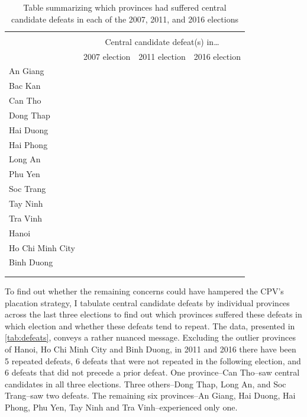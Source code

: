 \documentclass[12pt]{article}
\newcommand{\1}{\mathbbm{1}}
\begin{document}
\begin{table}[]
	\centering
	\caption{Table summarizing which provinces had suffered central candidate defeats in each of the 2007, 2011, and 2016 elections}
	\label{tab:defeats}
	\begin{tabular}{lccc}
		\\[-1.8ex]
		\hline
		\hline
		\\[-1.8ex]
		& \multicolumn{3}{c}{Central candidate defeat(s) in…}                                                       \\
		& \multicolumn{1}{l}{2007 election} & \multicolumn{1}{l}{2011 election} & \multicolumn{1}{l}{2016 election} \\ \midrule
		An Giang         & \checkmark  &   &   \\
		Bac Kan          &   & \checkmark  &   \\
		Can Tho          & \checkmark  & \checkmark  & \checkmark  \\
		Dong Thap        &   & \checkmark  & \checkmark  \\
		Hai Duong        &   & \checkmark  &   \\
		Hai Phong        & \checkmark  &   &   \\
		Long An          & \checkmark  & \checkmark  &   \\
		Phu Yen          &   &   & \checkmark  \\
		Soc Trang        &   & \checkmark  & \checkmark  \\
		Tay Ninh         & \checkmark  &   &   \\
		Tra Vinh         &   &   & \checkmark  \\  \midrule	
		Hanoi            & \checkmark & \checkmark  & \checkmark  \\
		Ho Chi Minh City & \checkmark  & \checkmark  & \checkmark  \\ 
		Binh Duong       & \checkmark  & \checkmark  &   \\
		
		\\[-1.8ex]
		\hline
		\hline
		\\[-1.8ex]
	\end{tabular}
\end{table}

To find out whether the remaining concerns could have hampered the CPV's placation strategy, I tabulate central candidate defeats by individual provinces across the last three elections to find out which provinces suffered these defeats in which election and whether these defeats tend to repeat. The data, presented in \autoref{tab:defeats}, conveys a rather nuanced message. Excluding the outlier provinces of Hanoi, Ho Chi Minh City and Binh Duong, in 2011 and 2016 there have been 5 repeated defeats, 6 defeats that were not repeated in the following election, and 6 defeats that did not precede a prior defeat. One province--Can Tho--saw central candidates in all three elections. Three others--Dong Thap, Long An, and Soc Trang--saw two defeats. The remaining six provinces--An Giang, Hai Duong, Hai Phong, Phu Yen, Tay Ninh and Tra Vinh--experienced only one.
\end{document}
